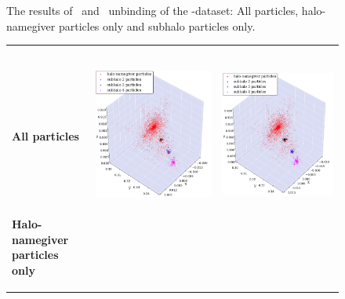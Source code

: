 \begin{subfigures}
\begin{figure}[!htbp]
{			\caption{\label{fig:cosmo_results_a}The results of \phewon\ and \simple\ unbinding of the \cosmo-dataset: All particles, halo-namegiver particles only and subhalo particles only.}
		}
	\end{figure}
	\begin{figure}[!htbp]%
		{
			\renewcommand{\arraystretch}{0.1}
			\centering	
			\begin{tabular}{|p{.5cm} c c|}
				\hline
				&&\\[1em]
				&	\neigh\ 	& \iter \\[1.5em]
				\begin{sideways}{\hspace{3cm} \textbf{All particles}}\end{sideways} \hspace*{-1em}	&		 
				{\includegraphics[width = .42\textwidth]{images/cosmo/cos-halo-66858-saddle.png}} \hspace*{-1em} 	& 
				{\includegraphics[width = .42\textwidth]{images/cosmo/cos-halo-66858-iter.png}} \hspace*{-1em}	\\
				\begin{sideways}{ \hspace{.5cm}\textbf{Halo-namegiver particles only} }\end{sideways}	 \hspace*{-1em}			 &			 

\end{tabular}}
\end{figure}
\end{subfigures}
